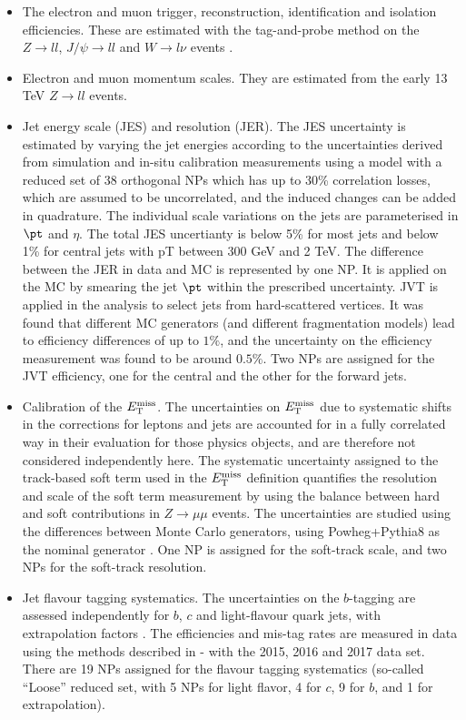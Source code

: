 \begin{itemize}
\item The electron and muon trigger, reconstruction, identification and isolation efficiencies. These are estimated with the tag-and-probe method on the $Z\to ll$, $J/\psi\to ll$ and $W\to l\nu$ events \cite{lep_sys}.
\item Electron and muon momentum scales. They are estimated from the early 13 TeV $Z\to ll$ events.
\item Jet energy scale (JES) and resolution (JER). The JES uncertainty is estimated by varying the jet energies according to the uncertainties derived from simulation and in-situ calibration measurements using a model with a reduced set of 38 orthogonal NPs \cite{jet_sys} which has up to 30\% correlation losses, which are assumed to be uncorrelated, and the induced changes can be added in quadrature. The individual scale variations on the jets are parameterised in $\pt$ and $\eta$. The total JES uncertianty is below 5\% for most jets and below 1\% for central jets with pT between 300 GeV and 2 TeV.
The difference between the JER in data and MC is represented by one NP. It is applied on the MC by smearing the jet $\pt$ within the prescribed uncertainty.
JVT is applied in the analysis to select jets from hard-scattered vertices. It was found that different MC generators (and different fragmentation models) lead to efficiency differences of up to $1\%$, and the uncertainty on the efficiency measurement was found to be around $0.5\%$. Two NPs are assigned for the JVT efficiency, one for the central and the other for the forward jets.
\item Calibration of the $E_{\text{T}}^{\text{miss}}$. The uncertainties on $E_{\text{T}}^{\text{miss}}$ due to systematic shifts in the corrections for leptons and jets are accounted for in a fully correlated way in their evaluation for those physics objects, and are therefore not considered independently here. The systematic uncertainty assigned to the track-based soft term used in the $E_{\text{T}}^{\text{miss}}$ definition quantifies the resolution and scale of the soft term measurement by using the balance between hard and soft contributions in $Z\to\mu\mu$ events. The uncertainties are studied using the differences between Monte Carlo generators, using Powheg+Pythia8 as the nominal generator \cite{met_sys}. One NP is assigned for the soft-track scale, and two NPs for the soft-track resolution.
\item Jet flavour tagging systematics. The uncertainties on the $b$-tagging are assessed independently for $b$, $c$ and light-flavour quark jets, with extrapolation factors \cite{btag_sys1}. The efficiencies and mis-tag rates are measured in data using the methods described in \cite{btag_sys2}-\cite{btag_sys3} with the 2015, 2016 and 2017 data set. There are 19 NPs assigned for the flavour tagging systematics (so-called ``Loose'' reduced set, with 5 NPs for light flavor, 4 for $c$, 9 for $b$, and 1 for extrapolation).

\end{itemize}
